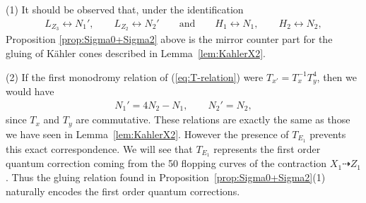 \documentclass[10pt,a4paper]{amsart}
\numberwithin{equation}{section}
\begin{document}
\begin{Remark}(1) It should be observed that, under the identification
\begin{gather*}
L_{Z_{3}}\leftrightarrow N_{1}',\qquad L_{Z_{2}}\leftrightarrow N_{2}'\qquad \text{and}\qquad H_{1}\leftrightarrow N_{1},\qquad H_{2}\leftrightarrow N_{2},
\end{gather*}
Proposition \ref{prop:Sigma0+Sigma2} above is the mirror counter part for the gluing of K\"ahler cones described in Lemma~\ref{lem:KahlerX2}.

(2) If the first monodromy relation of (\ref{eq:T-relation}) were $T_{x'}=T_{x}^{-1}T_{y}^{4}$, then we would have
\begin{gather*}
N_{1}'=4N_{2}-N_{1},\qquad N_{2}'=N_{2},
\end{gather*}
since $T_{x}$ and $T_{y}$ are commutative. These relations are exactly the same as those we have seen in Lemma~\ref{lem:KahlerX2}. However the presence of $T_{E_{1}}$ prevents this exact correspondence. We will see that $T_{E_{1}}$ represents the first order quantum correction coming from the 50 flopping curves of the contraction $X_{1}\dashrightarrow Z_{1}$. Thus the gluing relation found in Proposition~\ref{prop:Sigma0+Sigma2}(1) naturally encodes the first order quantum corrections.
\end{Remark}
\end{document}
